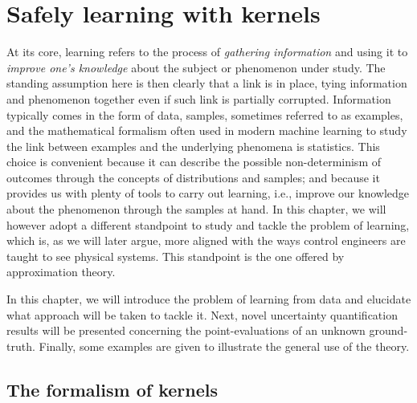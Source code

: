 \cleardoublepage
\chapter{Safely learning with kernels}

At its core, learning refers to the process of \textit{gathering information} and using it to \textit{improve one's knowledge} about the subject or phenomenon under study. The standing assumption here is then clearly that a link is in place, tying information and phenomenon together even if such link is partially corrupted. Information typically comes in the form of data, samples, sometimes referred to as examples, and
the mathematical formalism often used in modern machine learning to study the link between examples and the underlying phenomena is statistics. This choice is convenient because it can describe the possible non-determinism of outcomes through the concepts of distributions and samples; and because it provides us with plenty of tools to carry out learning, i.e., improve our knowledge about the phenomenon through the samples at hand. In this chapter, we will however adopt a different standpoint to study and tackle the problem of learning, which is, as we will later argue, more aligned with the ways control engineers are taught to see physical systems. This standpoint is the one offered by approximation theory.

In this chapter, we will introduce the problem of learning from data and elucidate what approach will be taken to tackle it. Next, novel uncertainty quantification results will be presented concerning the point-evaluations of an  unknown ground-truth. Finally, some examples are given to illustrate the general use of the theory.


\section{The formalism of kernels}
\label{sec.formalism_of_kernels}

